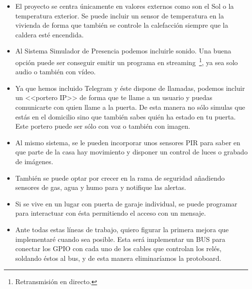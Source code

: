 \begin{itemize}
\item El proyecto se centra únicamente en valores externos como son el Sol o la temperatura exterior. Se puede incluir un sensor de temperatura en la vivienda de forma que también se controle la calefacción siempre que la caldera esté encendida.

\item Al Sistema Simulador de Presencia podemos incluirle sonido. Una buena opción puede ser conseguir emitir un programa en streaming~\footnote{Retransmisión en directo.}, ya sea solo audio o también con vídeo.

\item Ya que hemos incluido Telegram y éste dispone de llamadas, podemos incluir un <<portero IP>> de forma que te llame a un usuario y puedas comunicarte con quien llame a la puerta. De esta manera no sólo simulas que estás en el domicilio sino que también sabes quién ha estado en tu puerta. Este portero puede ser sólo con voz o también con imagen.

\item Al mismo sistema, se le pueden incorporar unos sensores PIR para saber en que parte de la casa hay movimiento y disponer un control de luces o grabado de imágenes.

\item También se puede optar por crecer en la rama de seguridad añadiendo sensores de gas, agua y humo para y notifique las alertas.

\item Si se vive en un lugar con puerta de garaje individual, se puede programar para interactuar con ésta permitiendo el acceso con un mensaje.

\item Ante todas estas líneas de trabajo, quiero figurar la primera mejora que implementaré cuando sea posible. Esta será implementar un BUS para conectar los GPIO con cada uno de los cables que controlan los relés, soldando éstos al bus, y de esta manera eliminaríamos la protoboard.

\end{itemize}
